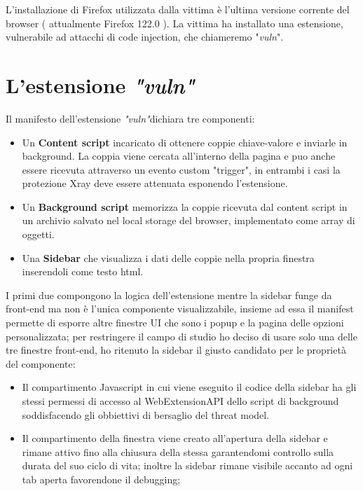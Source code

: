 \documentclass[]{./sapthesis/sapthesis}
\newcommand{\vuln}{\textit{"vuln"}}
\begin{document}
        L'installazione di Firefox utilizzata dalla vittima è l'ultima versione corrente
        del browser ( attualmente Firefox 122.0 ). La vittima ha installato una estensione,
        vulnerabile ad attacchi di code injection, che chiameremo "\textit{vuln}".


    \section{L'estensione \vuln}

        Il manifesto dell'estensione \vuln dichiara tre componenti:
        \begin{itemize}
            \item Un \textbf{Content script} incaricato di ottenere coppie chiave-valore
                e inviarle in background. La coppia viene cercata all'interno della pagina
                e puo anche essere ricevuta attraverso un evento custom "trigger", in
                entrambi i casi la protezione Xray deve essere attenuata esponendo l'estensione.

            \item Un \textbf{Background script} memorizza la coppie ricevuta dal content script 
                in un archivio salvato nel local storage del browser, implementato
                come array di oggetti.

            \item Una \textbf{Sidebar} che visualizza i dati delle coppie nella propria finestra
                inserendoli come testo html.
        \end{itemize}

        I primi due compongono la logica dell'estensione mentre la sidebar funge da front-end ma
        non è l'unica componente visualizzabile, insieme ad essa il manifest permette
        di esporre altre finestre UI che sono i popup e la pagina delle opzioni personalizzata; per
        restringere il campo di studio ho deciso di usare solo una delle tre finestre front-end,
        ho ritenuto la sidebar il giusto candidato per le proprietà del componente:
        \begin{itemize}
            \item Il compartimento Javascript in cui viene eseguito il codice della sidebar
                ha gli stessi permessi di accesso al WebExtensionAPI dello script di background
                soddisfacendo gli obbiettivi di bersaglio del threat model.
            
            \item Il compartimento della finestra viene creato all'apertura della sidebar e rimane
                attivo fino alla chiusura della stessa garantendomi controllo sulla durata
                del suo ciclo di vita; inoltre la sidebar rimane visibile accanto ad ogni tab aperta
                favorendone il debugging;
                
        \end{itemize}
\end{document}
